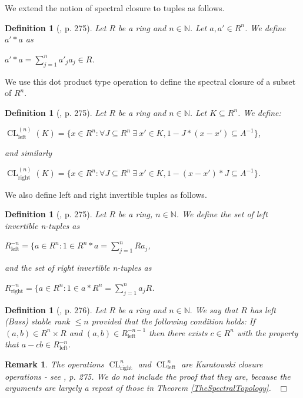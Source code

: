 \documentclass[12pt, oneside]{book}
\newtheorem{definition}[theorem]{Definition}
\newtheorem{remark}[theorem]{Remark}
\newcommand{\qed}{\hfill ~$\Box$\\}
\def\CL{\operatorname{CL}}
\def\Left{\operatorname{left}}
\def\Right{\operatorname{right}}
\begin{document}
We extend the notion of spectral closure to tuples as follows.

\begin{definition}[{\cite{CH3}, p. 275}]
\normalfont
Let $R$ be a ring and $n \in \mathbb{N}$. Let $a, a' \in R^n$. We define $a' \ast a$ as
\begin{center}
$a' \ast a = \displaystyle \sum_{j = 1}^n a'_j  a_j \in R$.
\end{center}
\end{definition}
We use this dot product type operation to define the spectral closure of a subset of $R^n$.
\begin{definition} [{\cite{CH3}, p. 275}]
\normalfont
Let $R$ be a ring and $n \in \mathbb{N}$. Let $K \subseteq R^n$. We define:
\begin{center}
$\CL^{(n)}_{\Left}(K) = \{ x \in R^n : \forall J \subseteq R^n \ \exists \ x' \in K, 1 - J\ast(x - x') \subseteq A^{-1} \}$,
\end{center}
and similarly
\begin{center}
$\CL^{(n)}_{\Right}(K) = \{ x \in R^n : \forall J \subseteq R^n \ \exists \ x' \in K, 1 - (x - x')\ast J \subseteq A^{-1} \}$.
\end{center}
\end{definition} \label{InvertibleTuples}
\noindent We also define left and right invertible tuples as follows.
\begin{definition}[{\cite{CH3}, p. 275}]
\normalfont
Let $R$ be a ring, $n \in \mathbb{N}$. We define the set of {\sl left invertible n-tuples} as
\begin{center}
$R^{-n}_{\Left} = \{ a \in R^n : 1 \in R^n \ast a = \displaystyle \sum_{j = 1}^n R a_j$,
\end{center}
and the set of {\sl right invertible n-tuples} as
\begin{center}
$R^{-n}_{\Right} = \{ a \in R^n : 1 \in a \ast R^n = \displaystyle \sum_{j = 1}^n a_jR$.
\end{center}
\end{definition}
\begin{definition} [{\cite{CH3}, p. 276}] \label{DefnBSR}
\normalfont
Let $R$ be a ring and $n \in \mathbb{N}.$ We say that $R$ has {\sl left (Bass) stable rank 
$\leqslant n$} provided that the following condition holds:
\vskip 0.3cm
\noindent If $(a, b) \in R^n \times R$ and $(a, b) \in R^{-n-1}_{\Left}$ then there exists 
$c \in R^n$ with the property that $a - cb \in R^{-n}_{\Left}$.  
\end{definition}
\begin{remark}
\normalfont
The operations $\CL^{n}_{\Right}$ and $\CL^{n}_{\Left}$ are Kuratowski closure operations - 
see \cite{CH3}, p. 275. We do not include the proof that they are, because the arguments are 
largely a repeat of those in Theorem \ref{TheSpectralTopology}.
\qed
\end{remark}
\end{document}
